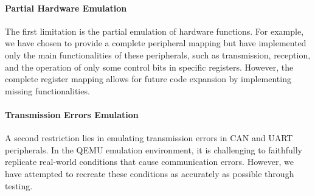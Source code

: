 \paragraph{Partial Hardware Emulation}
The first limitation is the partial emulation of hardware functions. For example, we have chosen to provide a complete peripheral mapping but have implemented only the main functionalities of these peripherals, such as transmission, reception, and the operation of only some control bits in specific registers. However, the complete register mapping allows for future code expansion by implementing missing functionalities.

\paragraph{Transmission Errors Emulation}
A second restriction lies in emulating transmission errors in CAN and UART peripherals. In the QEMU emulation environment, it is challenging to faithfully replicate real-world conditions that cause communication errors. However, we have attempted to recreate these conditions as accurately as possible through testing.

